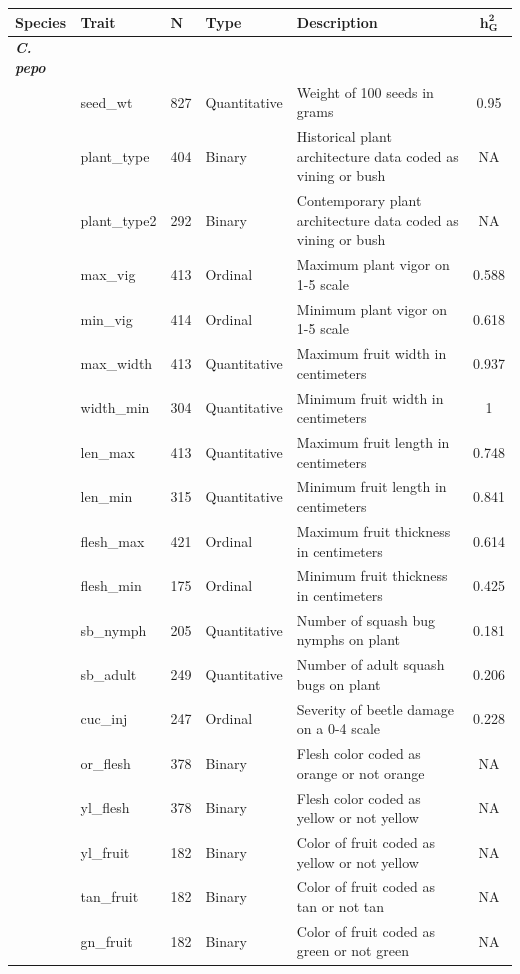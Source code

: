 \documentclass[utf8]{FrontiersinHarvard} %
\begin{document}
\begin{center}
\begin{longtable}{l l l l p{5cm} c}
\hline
\textbf{Species} & \textbf{Trait} & $\mathbf{N}$ &\textbf{Type} & \textbf{Description} & $\mathbf{h_{G}^{2}}$ \\
\hline
\textbf{\emph{C. pepo}} & & & & & \\
& seed\_wt & 827 &Quantitative & Weight of 100 seeds in grams& 0.95 \\
& plant\_type & 404 &Binary & Historical plant architecture data coded as vining or bush& NA \\
& plant\_type2 & 292 &Binary & Contemporary plant architecture data coded as vining or bush& NA\\
& max\_vig & 413 & Ordinal & Maximum plant vigor on 1-5 scale& 0.588 \\
& min\_vig & 414 &Ordinal & Minimum plant vigor on 1-5 scale & 0.618 \\
& max\_width & 413 &Quantitative & Maximum fruit width in centimeters & 0.937 \\
& width\_min & 304 &Quantitative & Minimum fruit width in centimeters & 1\\
& len\_max & 413 &Quantitative & Maximum fruit length in centimeters & 0.748\\
& len\_min & 315 &Quantitative & Minimum fruit length in centimeters & 0.841\\
& flesh\_max & 421 &Ordinal & Maximum fruit thickness in centimeters & 0.614\\
& flesh\_min & 175 & Ordinal & Minimum fruit thickness in centimeters & 0.425\\
& sb\_nymph & 205 & Quantitative & Number of squash bug nymphs on plant & 0.181 \\
& sb\_adult & 249 &Quantitative & Number of adult squash bugs on plant & 0.206 \\
& cuc\_inj & 247 &Ordinal & Severity of beetle damage on a 0-4 scale & 0.228\\
& or\_flesh & 378 &Binary & Flesh color coded as orange or not orange & NA \\
& yl\_flesh & 378 &Binary & Flesh color coded as yellow or not yellow & NA \\
& yl\_fruit & 182 &Binary & Color of fruit coded as yellow or not yellow & NA\\
& tan\_fruit & 182 &Binary & Color of fruit coded as tan or not tan & NA \\
& gn\_fruit & 182 &Binary & Color of fruit coded as green or not green & NA \\

\end{longtable}
\end{center}
\end{document}
